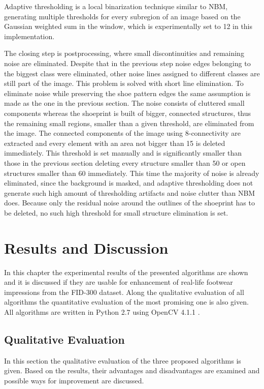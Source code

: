 \documentclass[draft,final]{vutinfth} %
\begin{document}
Adaptive thresholding is a local binarization technique similar to NBM, generating multiple thresholds for every subregion of an image based on the Gaussian weighted sum in the window, which is experimentally set to 12 in this implementation.
\par
The closing step is postprocessing, where small discontinuities and remaining noise are eliminated.
Despite that in the previous step noise edges belonging to the biggest class were eliminated, other noise lines assigned to different classes are still part of the image.
This problem is solved with short line elimination.
To eliminate noise while preserving the shoe pattern edges the same assumption is made as the one in the previous section.
The noise consists of cluttered small components whereas the shoeprint is built of bigger, connected structures, thus the remaining small regions, smaller than a given threshold, are eliminated from the image.
The connected components of the image using 8-connectivity are extracted and every element with an area not bigger than 15 is deleted immediately.
This threshold is set manually and is significantly smaller than those in the previous section deleting every structure smaller than 50 or open structures smaller than 60 immediately.
This time the majority of noise is already eliminated, since the background is masked, and adaptive thresholding does not generate such high amount of thresholding artifacts and noise clutter than NBM does.
Because only the residual noise around the outlines of the shoeprint has to be deleted, no such high threshold for small structure elimination is set.

\chapter{Results and Discussion}
\label{results}
\par
In this chapter the experimental results of the presented algorithms are shown and it is discussed if they are usable for enhancement of real-life footwear impressions from the FID-300 dataset.
Along the qualitative evaluation of all algorithms the quantitative evaluation of the most promising one is also given.
All algorithms are written in Python 2.7 \cite{van1995python} using OpenCV 4.1.1 \cite{opencv_library}.

\section{Qualitative Evaluation}
In this section the qualitative evaluation of the three proposed algorithms is given.
Based on the results, their advantages and disadvantages are examined and possible ways for improvement are discussed.  
\end{document}
